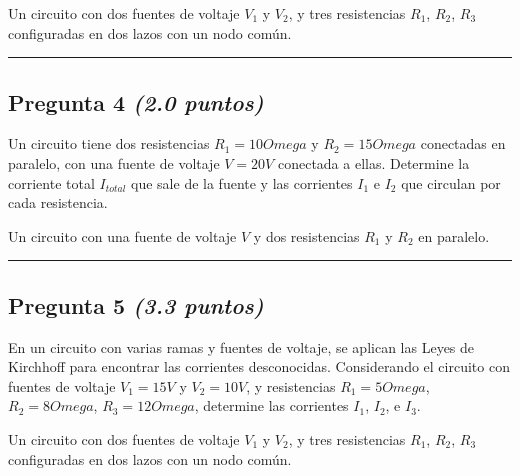 \documentclass[11pt,a4paper]{article}
\begin{document}
  \begin{tcolorbox}[colback=gray!5, colframe=gray!40, fonttitle=\bfseries, title={Diagrama sugerido}]
    Un circuito con dos fuentes de voltaje $V_1$ y $V_2$, y tres resistencias $R_1$, $R_2$, $R_3$ configuradas en dos lazos con un nodo común.
  \end{tcolorbox}

\vspace{2mm}
\rule{\linewidth}{0.2pt}
\vspace{3cm}  %



\subsection*{Pregunta 4 \normalfont\normalsize\textit{(2.0 puntos)}}
Un circuito tiene dos resistencias $R_1 = 10Omega$ y $R_2 = 15Omega$ conectadas en paralelo, con una fuente de voltaje $V = 20V$ conectada a ellas. Determine la corriente total $I_{total}$ que sale de la fuente y las corrientes $I_1$ e $I_2$ que circulan por cada resistencia.

  \begin{tcolorbox}[colback=gray!5, colframe=gray!40, fonttitle=\bfseries, title={Diagrama sugerido}]
    Un circuito con una fuente de voltaje $V$ y dos resistencias $R_1$ y $R_2$ en paralelo.
  \end{tcolorbox}

\vspace{2mm}
\rule{\linewidth}{0.2pt}
\vspace{3cm}  %



\subsection*{Pregunta 5 \normalfont\normalsize\textit{(3.3 puntos)}}
En un circuito con varias ramas y fuentes de voltaje, se aplican las Leyes de Kirchhoff para encontrar las corrientes desconocidas. Considerando el circuito con fuentes de voltaje $V_1 = 15V$ y $V_2 = 10V$, y resistencias $R_1 = 5Omega$, $R_2 = 8Omega$, $R_3 = 12Omega$, determine las corrientes $I_1$, $I_2$, e $I_3$.

  \begin{tcolorbox}[colback=gray!5, colframe=gray!40, fonttitle=\bfseries, title={Diagrama sugerido}]
    Un circuito con dos fuentes de voltaje $V_1$ y $V_2$, y tres resistencias $R_1$, $R_2$, $R_3$ configuradas en dos lazos con un nodo común.
  \end{tcolorbox}
\end{document}
